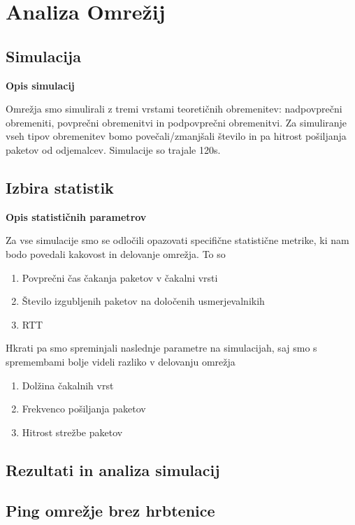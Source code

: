 \documentclass[11pt, a4paper, slovene]{book}
\begin{document}
\section{Analiza Omrežij} 
\subsection{Simulacija} 
\large \bf Opis simulacij 
\normalfont \normalsize

Omrežja smo simulirali z tremi vrstami teoretičnih obremenitev: nadpovprečni obremeniti, povprečni obremenitvi in podpovprečni obremenitvi. Za simuliranje vseh tipov obremenitev bomo povečali/zmanjšali število in pa hitrost pošiljanja paketov od odjemalcev. Simulacije so trajale 120s.  

\subsection{Izbira statistik} 
\large \bf Opis statističnih parametrov 
\normalfont \normalsize

Za vse simulacije smo se odločili opazovati specifične statistične metrike, ki nam bodo povedali kakovost in delovanje omrežja. To so

\begin{enumerate}
	\item Povprečni čas čakanja paketov v čakalni vrsti
	\item Število izgubljenih paketov na določenih usmerjevalnikih
	\item RTT
\end{enumerate}

Hkrati pa smo spreminjali naslednje parametre na simulacijah, saj smo s spremembami bolje videli razliko v delovanju omrežja

\begin{enumerate}
	\item Dolžina čakalnih vrst
	\item Frekvenco pošiljanja paketov
	\item Hitrost strežbe paketov
\end{enumerate}


	
\subsection{Rezultati in analiza simulacij}

\subsection{Ping omrežje brez hrbtenice}
\end{document}
